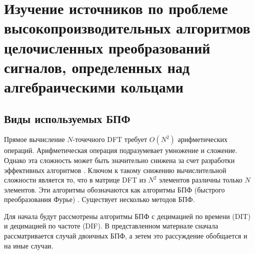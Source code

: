 \chapter{Изучение источников по проблеме высокопроизводительных алгоритмов целочисленных преобразований сигналов, определенных над алгебраическими кольцами}
\section{Виды используемых БПФ}
Прямое вычисление $N$-точечного DFT требует $O(N^2)$ арифметических операций.
Арифметическая операция подразумевает умножение и сложение.
Однако эта сложность может быть значительно снижена за счет разработки эффективных алгоритмов \cite{FFTs, BrighamFFT}.
Ключом к такому снижению вычислительной сложности является то, что в матрице DFT из $N^2$ элементов различны только $N$ элементов.
Эти алгоритмы обозначаются как алгоритмы БПФ (быстрого преобразования Фурье) \cite{БПФ}.
Существует несколько методов БПФ.

Для начала будут рассмотрены алгоритмы БПФ с децимацией по времени (DIT) и децимацией по частоте (DIF).
В представленном материале сначала рассматривается случай двоичных БПФ, а зетем это рассуждение обобщается и на иные случаи.

